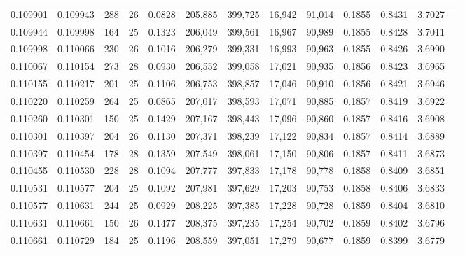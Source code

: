 \begin{tabular}{rrrrrrrrrrrrr}
0.109901 & 0.109943 & 288 &  26 &                                     0.0828 & 205,885 & 399,725 &  16,942 &  91,014 & 0.1855 & 0.8431 & 3.7027 \\
0.109944 & 0.109998 & 164 &  25 &                                     0.1323 & 206,049 & 399,561 &  16,967 &  90,989 & 0.1855 & 0.8428 & 3.7011 \\
0.109998 & 0.110066 & 230 &  26 &                                     0.1016 & 206,279 & 399,331 &  16,993 &  90,963 & 0.1855 & 0.8426 & 3.6990 \\
0.110067 & 0.110154 & 273 &  28 &                                     0.0930 & 206,552 & 399,058 &  17,021 &  90,935 & 0.1856 & 0.8423 & 3.6965 \\
0.110155 & 0.110217 & 201 &  25 &                                     0.1106 & 206,753 & 398,857 &  17,046 &  90,910 & 0.1856 & 0.8421 & 3.6946 \\
0.110220 & 0.110259 & 264 &  25 &                                     0.0865 & 207,017 & 398,593 &  17,071 &  90,885 & 0.1857 & 0.8419 & 3.6922 \\
0.110260 & 0.110301 & 150 &  25 &                                     0.1429 & 207,167 & 398,443 &  17,096 &  90,860 & 0.1857 & 0.8416 & 3.6908 \\
0.110301 & 0.110397 & 204 &  26 &                                     0.1130 & 207,371 & 398,239 &  17,122 &  90,834 & 0.1857 & 0.8414 & 3.6889 \\
0.110397 & 0.110454 & 178 &  28 &                                     0.1359 & 207,549 & 398,061 &  17,150 &  90,806 & 0.1857 & 0.8411 & 3.6873 \\
0.110455 & 0.110530 & 228 &  28 &                                     0.1094 & 207,777 & 397,833 &  17,178 &  90,778 & 0.1858 & 0.8409 & 3.6851 \\
0.110531 & 0.110577 & 204 &  25 &                                     0.1092 & 207,981 & 397,629 &  17,203 &  90,753 & 0.1858 & 0.8406 & 3.6833 \\
0.110577 & 0.110631 & 244 &  25 &                                     0.0929 & 208,225 & 397,385 &  17,228 &  90,728 & 0.1859 & 0.8404 & 3.6810 \\
0.110631 & 0.110661 & 150 &  26 &                                     0.1477 & 208,375 & 397,235 &  17,254 &  90,702 & 0.1859 & 0.8402 & 3.6796 \\
0.110661 & 0.110729 & 184 &  25 &                                     0.1196 & 208,559 & 397,051 &  17,279 &  90,677 & 0.1859 & 0.8399 & 3.6779 \\

\end{tabular}
